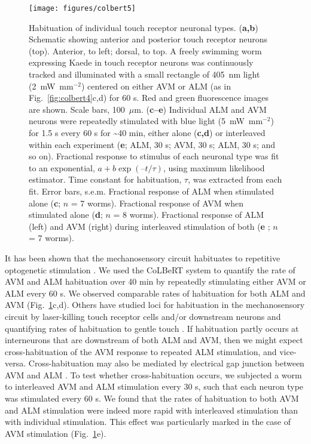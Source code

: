 \begin{figure} 
\texttt{[image: figures/colbert5]}
\caption[Habituation of individual touch receptor neuronal types.]{ Habituation of individual touch receptor neuronal types. (\textbf{a,b}) Schematic showing anterior and posterior touch receptor neurons (top). Anterior, to left; dorsal, to top. A freely swimming worm expressing Kaede in touch receptor neurons was continuously tracked and illuminated with a small rectangle of 405~nm light (2~mW~mm$^{-2}$) centered on either AVM or ALM (as in Fig.~\ref{fig:colbert4}c,d) for 60 s. Red and green fluorescence images are shown. Scale bars, 100~$\mu$m. (\textbf{c–e}) Individual ALM and AVM neurons were repeatedly stimulated with blue light (5~mW~mm$^{-2}$) for 1.5 s every 60 s for \textasciitilde40 min, either alone (\textbf{c,d}) or interleaved within each experiment (\textbf{e}; ALM, 30 s; AVM, 30 s; ALM, 30 s; and so on). Fractional response to stimulus of each neuronal type was fit to an exponential, $a + b \exp(–t/\tau)$, using maximum likelihood estimator. Time constant for habituation, $\tau$, was extracted from each fit. Error bars, s.e.m. Fractional response of ALM when stimulated alone (\textbf{c}; $n$ = 7 worms). Fractional response of AVM when stimulated alone (\textbf{d}; $n$ = 8 worms). Fractional response of ALM (left) and AVM (right) during interleaved stimulation of both (\textbf{e} ; $n$ = 7 worms).\label{fig:colbert5}}
\end{figure}

It has been shown that the mechanosensory circuit habituates to repetitive optogenetic stimulation \citep{nagel_light_2005}. We used the CoLBeRT system to quantify the rate of AVM and ALM habituation over 40 min by repeatedly stimulating either AVM or ALM every 60 s. We observed comparable rates of habituation for both ALM and AVM (Fig.~\ref{fig:colbert5}c,d). Others have studied loci for habituation in the mechanosensory circuit by laser-killing touch receptor cells and/or downstream neurons and quantifying rates of habituation to gentle touch \citep{wyart_optogenetic_2009}. If habituation partly occurs at interneurons that are downstream of both ALM and AVM, then we might expect cross-habituation of the AVM response to repeated ALM stimulation, and vice-versa. Cross-habituation may also be mediated by electrical gap junction between AVM and ALM \citep{white_structure_1976}. To test whether cross-habituation occurs, we subjected a worm to interleaved AVM and ALM stimulation every 30 s, such that each neuron type was stimulated every 60 s. We found that the rates of habituation to both AVM and ALM stimulation were indeed more rapid with interleaved stimulation than with individual stimulation. This effect was particularly marked in the case of AVM stimulation (Fig.~\ref{fig:colbert5}e).

